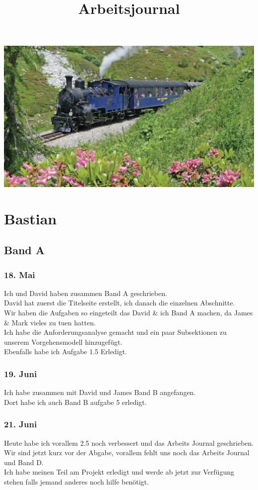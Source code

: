 \documentclass[10pt]{article}
\title{Arbeitsjournal}
\begin{document}
	\maketitle
	\includegraphics[width=17.5cm]{title}
	\pagebreak
	\tableofcontents
	\pagebreak
	\section{Bastian}
		\subsection{Band A}
			\subsubsection{18. Mai}
			Ich und David haben zusammen Band A geschrieben.\\
			David hat zuerst die Titelseite erstellt, ich danach die einzelnen Abschnitte.\\
			Wir haben die Aufgaben so eingeteilt das David \& ich Band A machen, da James \& Mark vieles zu tuen hatten.\\
			Ich habe die Anforderungsanalyse gemacht und ein paar Subsektionen zu unserem Vorgehensmodell hinzugefügt.\\
			Ebenfalls habe ich Aufgabe 1.5 Erledigt.
			
			\subsubsection{19. Juni}
			Ich habe zusammen mit David und James Band B angefangen.\\
			Dort habe ich auch Band B aufgabe 5 erledigt.
			
			\subsubsection{21. Juni}
			Heute habe ich vorallem 2.5 noch verbessert und das Arbeits Journal geschrieben.\\
			Wir sind jetzt kurz vor der Abgabe, vorallem fehlt uns noch das Arbeits Journal und Band D.\\
			Ich habe meinen Teil am Projekt erledigt und werde ab jetzt zur Verfügung stehen falls jemand anderes noch hilfe benötigt.
			
\end{document}
